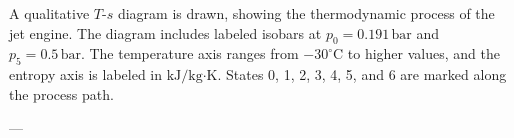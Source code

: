 A qualitative \( T \)-\( s \) diagram is drawn, showing the thermodynamic process of the jet engine. The diagram includes labeled isobars at \( p_0 = 0.191 \, \text{bar} \) and \( p_5 = 0.5 \, \text{bar} \). The temperature axis ranges from \( -30^\circ\text{C} \) to higher values, and the entropy axis is labeled in \( \text{kJ/kg·K} \). States 0, 1, 2, 3, 4, 5, and 6 are marked along the process path.

---